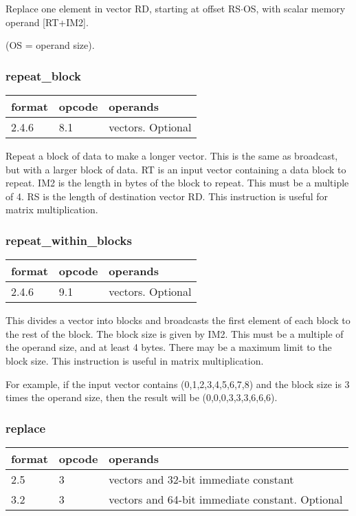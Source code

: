 \documentclass[forwardcom.tex]{subfiles}
\begin{document}
Replace one element in vector RD, starting
at offset RS$\cdot$OS, with scalar memory operand
[RT+IM2].

(OS = operand size).

\subsubsection{repeat\_block}
\label{table:repeatBlockInstruction}
\begin{tabular}{|p{12mm}|p{12mm}|p{110mm}|}
\hline
\bfseries format & \bfseries opcode & \bfseries operands \\ \hline
2.4.6 & 8.1 & vectors. Optional \\ \hline
\end{tabular}
\vspace{2mm}

Repeat a block of data to make a longer vector. This is the same as broadcast, but with a larger block of data. RT is an input vector containing a data block to repeat. IM2 is the length in bytes of the block to repeat. This must be a multiple of 4. RS is the length of destination vector RD. This instruction is useful for matrix multiplication.

\subsubsection{repeat\_within\_blocks}
\label{table:repeatWithinBlockInstruction}
\begin{tabular}{|p{12mm}|p{12mm}|p{110mm}|}
\hline
\bfseries format & \bfseries opcode & \bfseries operands \\ \hline
2.4.6 & 9.1 & vectors. Optional \\ \hline
\end{tabular}
\vspace{2mm}

This divides a vector into blocks and broadcasts the first element of each block to the rest of the block. The block size is given by IM2. This must be a multiple of the operand size, and at least 4 bytes. There may be a maximum limit to the block size. This instruction is useful in matrix multiplication. 
\vspace{2mm}

For example, if the input vector contains (0,1,2,3,4,5,6,7,8) and the block size is 3 times the operand size, then the result will be (0,0,0,3,3,3,6,6,6).

\subsubsection{replace}
\label{table:replaceInstruction}
\begin{tabular}{|p{12mm}|p{12mm}|p{110mm}|}
\hline
\bfseries format & \bfseries opcode & \bfseries operands \\ \hline
2.5 & 3 & vectors and 32-bit immediate constant \\ \hline
3.2 & 3 & vectors and 64-bit immediate constant. Optional \\ \hline
\end{tabular}
\vspace{2mm}
\end{document}

